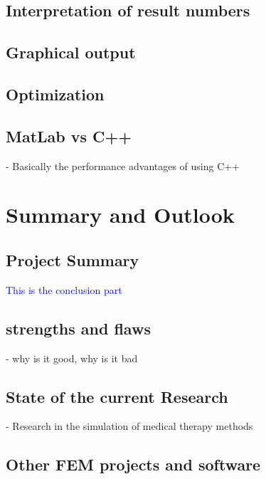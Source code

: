 \documentclass[parskip=half, titlepage=yes, 12pt, BCOR=12mm, DIV=calc]{scrartcl}
\begin{document}
\subsection{Interpretation of result numbers}

\subsection{Graphical output}

\subsection{Optimization}

\subsection{MatLab vs C++}

- Basically the performance advantages of using C++


\section{Summary and Outlook}

\subsection{Project Summary}

\textcolor{blue}
{
This is the conclusion part
}

\subsection{strengths and flaws}
- why is it good, why is it bad

\subsection{State of the current Research}
- Research in the simulation of medical therapy methods \\

\subsection{Other FEM projects and software}


\newpage


\clearpage
\nocite{*}
\printbibliography

\newpage

\appendix

 
\end{document}
